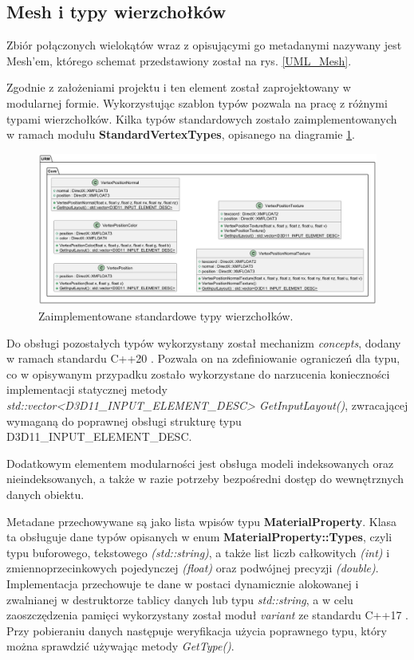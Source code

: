 \subsection{Mesh i typy wierzchołków}
\label{SSMeshVertexTypeConcept}
	Zbiór połączonych wielokątów wraz z opisującymi go metadanymi nazywany jest Mesh'em, którego schemat przedstawiony został na rys. \ref{UML_Mesh}.
	
	Zgodnie z założeniami projektu i ten element został zaprojektowany w modularnej formie. Wykorzystując szablon typów pozwala na pracę z różnymi typami wierzchołków. Kilka typów standardowych zostało zaimplementowanych w ramach modułu \textbf{StandardVertexTypes}, opisanego na diagramie \ref{UML_VertexTypes}.
	
	\begin{figure}[h!]
		\centering
		\includegraphics[width=\textwidth]{images/UML/vertextypes.png}
		\caption{Zaimplementowane standardowe typy wierzchołków.}
		\label{UML_VertexTypes}
	\end{figure}
	
	Do obsługi pozostałych typów wykorzystany został mechanizm \textit{concepts}, dodany w ramach standardu C++20 \cite{cpp20:concepts:2025}.
	Pozwala on na zdefiniowanie ograniczeń dla typu, co w opisywanym przypadku zostało wykorzystane do narzucenia konieczności implementacji statycznej metody \textit{std::vector<D3D11\_INPUT\_ELEMENT\_DESC> GetInputLayout()}, zwracającej wymaganą do poprawnej obsługi strukturę typu D3D11\_INPUT\_ELEMENT\_DESC.

	Dodatkowym elementem modularności jest obsługa modeli indeksowanych oraz nieindeksowanych, a także w razie potrzeby bezpośredni dostęp do wewnętrznych danych obiektu.
	
	Metadane przechowywane są jako lista wpisów typu \textbf{MaterialProperty}. Klasa ta obsługuje dane typów opisanych w enum \textbf{MaterialProperty::Types}, czyli typu buforowego, tekstowego \textit{(std::string)}, a także list liczb całkowitych \textit{(int)} i zmiennoprzecinkowych pojedynczej \textit{(float)} oraz podwójnej precyzji \textit{(double)}. Implementacja przechowuje te dane w postaci dynamicznie alokowanej i zwalnianej w destruktorze tablicy danych lub typu \textit{std::string}, a w celu zaoszczędzenia pamięci wykorzystany został moduł \textit{variant} ze standardu C++17 \cite{cpp17:variant:2025}. Przy pobieraniu danych następuje weryfikacja użycia poprawnego typu, który można sprawdzić używając metody \textit{GetType()}.
	
